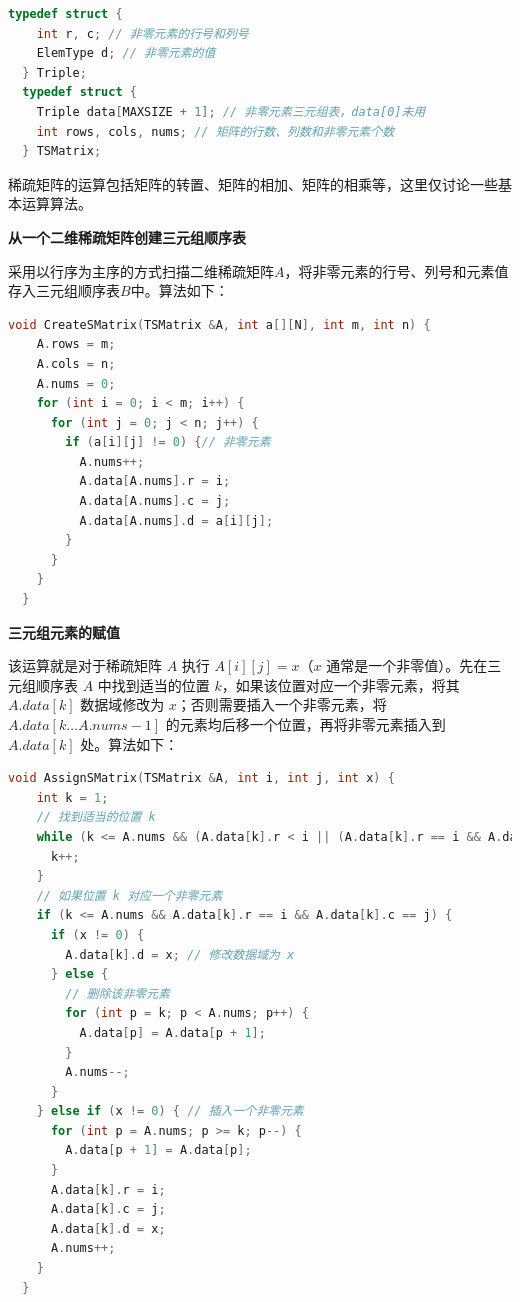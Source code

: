 \documentclass[lang=cn,newtx,10pt,scheme=chinese]{elegantbook}
\begin{document}
\begin{lstlisting}[language=C++, caption={三元组顺序表的数据类型定义}]
  typedef struct {
    int r, c; // 非零元素的行号和列号
    ElemType d; // 非零元素的值
  } Triple;
  typedef struct {
    Triple data[MAXSIZE + 1]; // 非零元素三元组表，data[0]未用
    int rows, cols, nums; // 矩阵的行数、列数和非零元素个数
  } TSMatrix;
\end{lstlisting}


稀疏矩阵的运算包括矩阵的转置、矩阵的相加、矩阵的相乘等，这里仅讨论一些基本运算算法。

\textbf{从一个二维稀疏矩阵创建三元组顺序表}

采用以行序为主序的方式扫描二维稀疏矩阵$A$，将非零元素的行号、列号和元素值存入三元组顺序表$B$中。算法如下：

\begin{lstlisting}[language=C++, caption={从一个二维稀疏矩阵创建三元组顺序表}]
  void CreateSMatrix(TSMatrix &A, int a[][N], int m, int n) {
    A.rows = m;
    A.cols = n;
    A.nums = 0;
    for (int i = 0; i < m; i++) {
      for (int j = 0; j < n; j++) {
        if (a[i][j] != 0) {// 非零元素
          A.nums++;
          A.data[A.nums].r = i;
          A.data[A.nums].c = j;
          A.data[A.nums].d = a[i][j];
        }
      }
    }
  }
\end{lstlisting}


\textbf{三元组元素的赋值}

该运算就是对于稀疏矩阵 $A$ 执行 $A[i][j] = x$（$x$ 通常是一个非零值）。先在三元组顺序表 $A$ 中找到适当的位置 $k$，如果该位置对应一个非零元素，将其 $A.data[k]$ 数据域修改为 $x$；否则需要插入一个非零元素，将 $A.data[k \dots A.nums-1]$ 的元素均后移一个位置，再将非零元素插入到 $A.data[k]$ 处。算法如下：

\begin{lstlisting}[language=C++, caption={稀疏矩阵三元组顺序表的赋值操作}]
  void AssignSMatrix(TSMatrix &A, int i, int j, int x) {
    int k = 1;
    // 找到适当的位置 k
    while (k <= A.nums && (A.data[k].r < i || (A.data[k].r == i && A.data[k].c < j))) {
      k++;
    }
    // 如果位置 k 对应一个非零元素
    if (k <= A.nums && A.data[k].r == i && A.data[k].c == j) {
      if (x != 0) {
        A.data[k].d = x; // 修改数据域为 x
      } else {
        // 删除该非零元素
        for (int p = k; p < A.nums; p++) {
          A.data[p] = A.data[p + 1];
        }
        A.nums--;
      }
    } else if (x != 0) { // 插入一个非零元素
      for (int p = A.nums; p >= k; p--) {
        A.data[p + 1] = A.data[p];
      }
      A.data[k].r = i;
      A.data[k].c = j;
      A.data[k].d = x;
      A.nums++;
    }
  }
\end{lstlisting}
\end{document}
